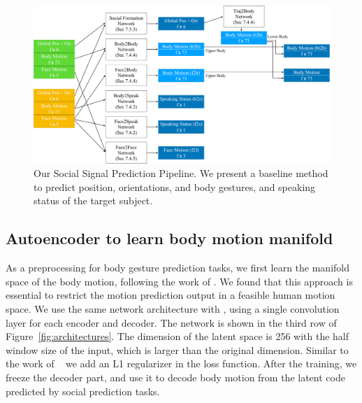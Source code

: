 \begin{figure}[t]	
	\includegraphics[width=\textwidth]{ssp_fig/ssp_pipeline_all}
	\caption{Our Social Signal Prediction Pipeline. We present a baseline method to predict position, orientations, and body gestures, and speaking status of the target subject. }
	\label{fig:pipeline}
\end{figure}

\subsection{Autoencoder to learn body motion manifold}
\label{sec:autoencoder}
As a preprocessing for body gesture prediction tasks, we first learn the manifold space of the body motion, following the work of \cite{holden2016deep}. We found that this approach is essential to restrict the motion prediction output in a feasible human motion space. We use the same network architecture with \cite{holden2016deep}, using a single convolution layer for each encoder and decoder. The network is shown in the third row of  Figure~\ref{fig:architectures}. The dimension of the latent space is 256 with the half window size of the input, which is larger than the original dimension. Similar to the work of ~\cite{holden2016deep} we add an L1 regularizer in the loss function. After the training, we freeze the decoder part, and use it to decode body motion from the latent code predicted by social prediction tasks.

